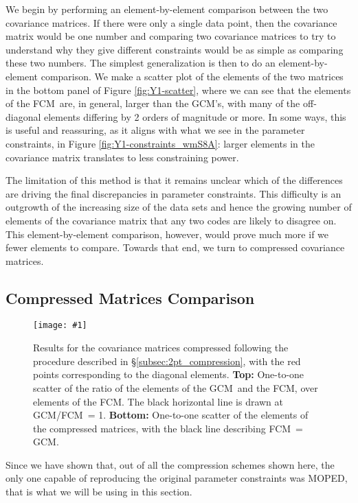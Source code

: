 \documentclass[aps, prd, twocolumn, superscriptaddress, nofootinbib, amssymb, amsmath]{revtex4-2}
\newcommand{\sfig}[2]{
	\texttt{[image: \#1]}
}
\newcommand{\rf}[1]{Figure \ref{fig:#1}}
\newcommand{\rssec}[1]{\S\ref{subsec:#1}}
\newcommand\full{the FCM}
\newcommand\gaussian{the GCM}
\begin{document}
We begin by performing an element-by-element comparison between the two covariance matrices. If there were only a single data point, then the covariance matrix would be one number and comparing two covariance matrices to try to understand why they give different constraints would be as simple as comparing these two numbers.  The simplest generalization is then to do an element-by-element comparison. We make a scatter plot of the elements of the two matrices in the bottom panel of \rf{Y1-scatter}, where we can see that the elements of \full\ are, in general, larger than \gaussian's, with many of the off-diagonal elements differing by 2 orders of magnitude or more. In some ways, this is useful and reassuring, as it aligns with what we see in the parameter constraints, in \rf{Y1-constraints_wmS8A}: larger elements in the covariance matrix translates to less constraining power. 

The limitation of this method is that it remains unclear which of the differences are driving the final discrepancies in parameter constraints. This difficulty is an outgrowth of the increasing size of the data sets and hence the growing number of elements of the covariance matrix that any two codes are likely to disagree on. This element-by-element comparison, however, would prove much more  if we fewer elements to compare. Towards that end, we turn to compressed covariance matrices.

\subsection{Compressed Matrices Comparison}
\label{subsec:compare_compressed}

\begin{figure}[thbp]
	\sfig{Comp2pt-scatter}{0.85\columnwidth}
	\caption{ Results for the covariance matrices compressed following the procedure described in \rssec{2pt_compression}, with the red points corresponding to the diagonal elements.
		\textbf{Top:}  One-to-one scatter of the ratio of the elements of \gaussian\ and \full, over elements of \full. The black horizontal line is drawn at GCM/FCM\ = 1.
		\textbf{Bottom:}  One-to-one scatter of the elements of the compressed matrices, with the black line describing FCM\ = GCM.}
	\label{fig:Comp2pt-scatter}
\end{figure}

Since we have shown that, out of all the compression schemes shown here, the only one capable of reproducing the original parameter constraints was MOPED, that is what we will be using in this section.
\end{document}
